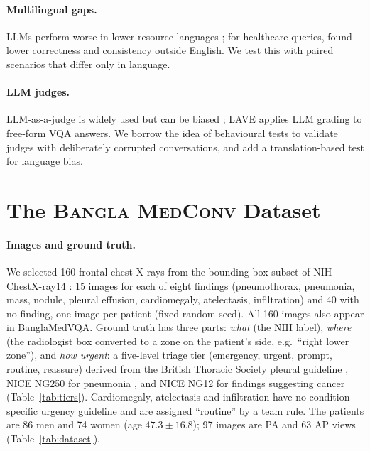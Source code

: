\documentclass[11pt]{article}
\newcommand{\bmc}{\textsc{Bangla MedConv}}
\begin{document}
\paragraph{Multilingual gaps.} LLMs perform worse in lower-resource languages \citep{ahuja2023mega,joshi2020state}; for healthcare queries, \citet{jin2024better} found lower correctness and consistency outside English. We test this with paired scenarios that differ only in language.

\paragraph{LLM judges.} LLM-as-a-judge is widely used but can be biased \citep{zheng2023judging}; LAVE \citep{manas2024lave} applies LLM grading to free-form VQA answers. We borrow the idea of behavioural tests \citep{ribeiro2020checklist} to validate judges with deliberately corrupted conversations, and add a translation-based test for language bias.

\section{The \bmc{} Dataset}\label{sec:data}
\paragraph{Images and ground truth.} We selected 160 frontal chest X-rays from the bounding-box subset of NIH ChestX-ray14 \citep{wang2017chestxray8}: 15 images for each of eight findings (pneumothorax, pneumonia, mass, nodule, pleural effusion, cardiomegaly, atelectasis, infiltration) and 40 with no finding, one image per patient (fixed random seed). All 160 images also appear in BanglaMedVQA. Ground truth has three parts: \emph{what} (the NIH label), \emph{where} (the radiologist box converted to a zone on the patient's side, e.g.\ ``right lower zone''), and \emph{how urgent}: a five-level triage tier (emergency, urgent, prompt, routine, reassure) derived from the British Thoracic Society pleural guideline \citep{roberts2023bts}, NICE NG250 for pneumonia \citep{nice2025ng250}, and NICE NG12 for findings suggesting cancer \citep{nice2015ng12} (Table~\ref{tab:tiers}). Cardiomegaly, atelectasis and infiltration have no condition-specific urgency guideline and are assigned ``routine'' by a team rule. The patients are 86 men and 74 women (age $47.3\pm16.8$); 97 images are PA and 63 AP views (Table~\ref{tab:dataset}).
\end{document}
